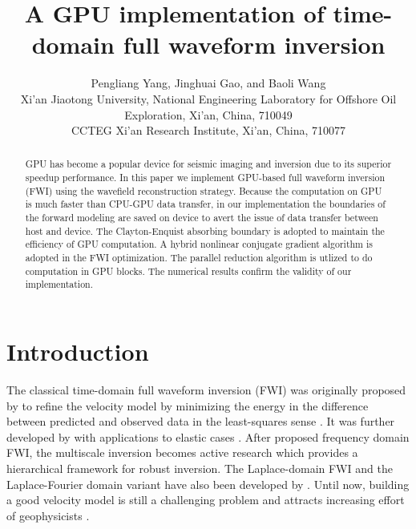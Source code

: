
\renewcommand{\thefootnote}{\fnsymbol{footnote}}

\title{A GPU implementation of time-domain full waveform inversion}

\author{Pengliang Yang\footnotemark[1], Jinghuai Gao\footnotemark[1], and Baoli Wang\footnotemark[2] \\
\footnotemark[1]Xi'an Jiaotong University, National Engineering Laboratory for Offshore Oil Exploration, Xi'an, China, 710049\\
\footnotemark[2]CCTEG  Xi'an Research Institute, Xi'an, China, 710077
}


\maketitle

\begin{abstract}
GPU has become a popular device for seismic imaging and inversion due to its superior speedup performance. In this paper we implement GPU-based full waveform inversion (FWI) using the wavefield reconstruction strategy. Because the computation on GPU is much faster than CPU-GPU data transfer, in our implementation the boundaries of the forward modeling are saved on device to avert the issue of data transfer between host and device. The Clayton-Enquist absorbing boundary is adopted to maintain the efficiency of GPU computation. A hybrid nonlinear conjugate gradient algorithm is adopted in the FWI optimization.  The parallel reduction algorithm is utlized to do computation in GPU blocks. The numerical results confirm the validity of our implementation. 

\end{abstract}


\section{Introduction}

The classical time-domain full waveform inversion (FWI) was originally proposed by \cite{tarantola1984inversion} to refine the velocity model by minimizing the energy in the difference between predicted and observed data in the least-squares sense \citep{symes2008migration}. It was further developed by \cite{tarantola1986strategy} with applications to elastic cases \citep{pica1990nonlinear}. 
After \cite{pratt1998gauss} proposed frequency domain FWI, the multiscale inversion becomes active research which provides a hierarchical framework for robust inversion. The Laplace-domain FWI and the Laplace-Fourier domain variant have also been developed by \cite{shin2008waveform,shin2009waveform}. Until now, building a good velocity model is still a challenging problem and attracts increasing effort of geophysicists \citep{virieux2009overview}. 

